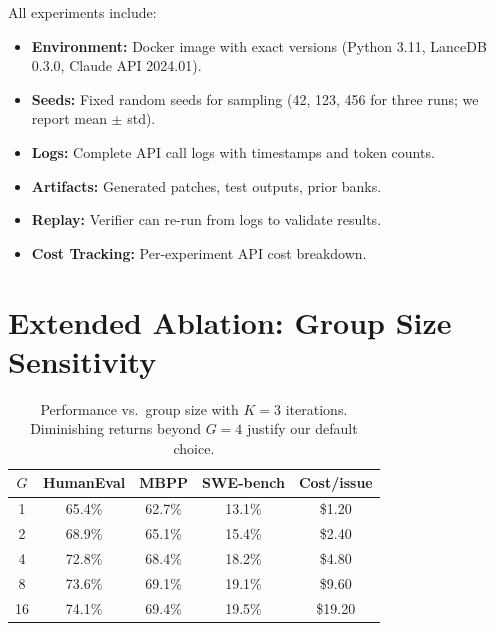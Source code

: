 \documentclass[11pt]{article}
\begin{document}
All experiments include:
\begin{itemize}[leftmargin=1.5em]
    \item \textbf{Environment:} Docker image with exact versions (Python 3.11,
          LanceDB 0.3.0, Claude API 2024.01).
    \item \textbf{Seeds:} Fixed random seeds for sampling (42, 123, 456 for
          three runs; we report mean $\pm$ std).
    \item \textbf{Logs:} Complete API call logs with timestamps and token counts.
    \item \textbf{Artifacts:} Generated patches, test outputs, prior banks.
    \item \textbf{Replay:} Verifier can re-run from logs to validate results.
    \item \textbf{Cost Tracking:} Per-experiment API cost breakdown.
\end{itemize}

\section{Extended Ablation: Group Size Sensitivity}
\label{app:group-size}

\begin{table}[h]
\centering
\begin{tabular}{ccccc}
\toprule
$G$ & HumanEval & MBPP & SWE-bench & Cost/issue \\
\midrule
1 & 65.4\% & 62.7\% & 13.1\% & \$1.20 \\
2 & 68.9\% & 65.1\% & 15.4\% & \$2.40 \\
4 & 72.8\% & 68.4\% & 18.2\% & \$4.80 \\
8 & 73.6\% & 69.1\% & 19.1\% & \$9.60 \\
16 & 74.1\% & 69.4\% & 19.5\% & \$19.20 \\
\bottomrule
\end{tabular}
\caption{Performance vs.\ group size with $K=3$ iterations. Diminishing
returns beyond $G=4$ justify our default choice.}
\label{tab:group-sensitivity}
\end{table}
\end{document}
